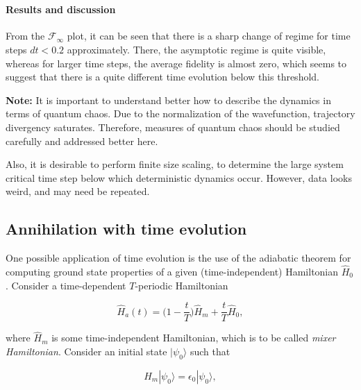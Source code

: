     \begin{center}
    \end{center}
    { \hspace*{\fill} \\}
    
    \hypertarget{results-and-discussion}{%
\paragraph{Results and discussion}\label{results-and-discussion}}

From the \(\mathcal{F}_{\infty}\) plot, it can be seen that there is a
sharp change of regime for time steps \(dt < 0.2\) approximately. There,
the asymptotic regime is quite visible, whereas for larger time steps,
the average fidelity is almost zero, which seems to suggest that there
is a quite different time evolution below this threshold.

\textbf{Note:} It is important to understand better how to describe the
dynamics in terms of quantum chaos. Due to the normalization of the
wavefunction, trajectory divergency saturates. Therefore, measures of
quantum chaos should be studied carefully and addressed better here.

Also, it is desirable to perform finite size scaling, to determine the
large system critical time step below which deterministic dynamics
occur. However, data looks weird, and may need be repeated.

    \hypertarget{annihilation-with-time-evolution}{%
\subsection{Annihilation with time
evolution}\label{annihilation-with-time-evolution}}

One possible application of time evolution is the use of the adiabatic
theorem for computing ground state properties of a given
(time-independent) Hamiltonian \(\hat{H}_0\). Consider a time-dependent
\(T\)-periodic Hamiltonian

\[
\hat{H}_a(t) = \big(1 - \frac{t}{T}\big)\hat{H}_m + \frac{t}{T}\hat{H}_0,
\]

\noindent where \(\hat{H}_m\) is some time-independent Hamiltonian, which is to be
called \emph{mixer Hamiltonian}. Consider an initial state
\(|\psi_0\rangle\) such that

\[
\hat{H}_m|\psi_0\rangle = \epsilon_0 |\psi_0\rangle,
\]

